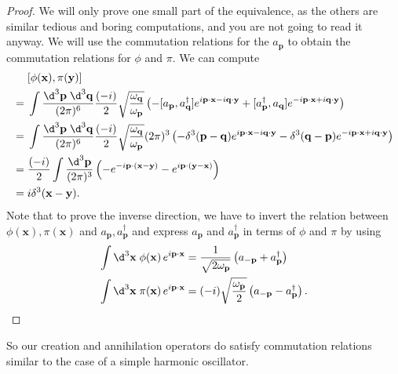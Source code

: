\documentclass[a4paper]{article}
\begin{document}
\begin{proof}
  We will only prove one small part of the equivalence, as the others are similar tedious and boring computations, and you are not going to read it anyway. We will use the commutation relations for the $a_\mathbf{p}$ to obtain the commutation relations for $\phi$ and $\pi$. We can compute
  \begin{align*}
    &[\phi(\mathbf{x}), \pi(\mathbf{y})]\\
    ={}& \int \frac{\d^3 \mathbf{p}\; \d^3 \mathbf{q}}{(2\pi)^6} \frac{(-i)}{2}\sqrt{\frac{\omega_\mathbf{q}}{\omega_\mathbf{p}}}\left(-[a_\mathbf{p}, a_\mathbf{q}^\dagger] e^{i\mathbf{p} \cdot \mathbf{x} - i \mathbf{q}\cdot \mathbf{y}} + [a_\mathbf{p}^\dagger, a_\mathbf{q}] e^{-i\mathbf{p}\cdot \mathbf{x} + i \mathbf{q}\cdot \mathbf{y}}\right)\\
    ={}& \int \frac{\d^3 \mathbf{p}\; \d^3 \mathbf{q}}{(2\pi)^6} \frac{(-i)}{2}\sqrt{\frac{\omega_\mathbf{q}}{\omega_\mathbf{p}}}(2\pi)^3\left(-\delta^3(\mathbf{p} - \mathbf{q}) e^{i\mathbf{p} \cdot \mathbf{x} - i \mathbf{q}\cdot \mathbf{y}} - \delta^3(\mathbf{q} - \mathbf{p}) e^{-i\mathbf{p}\cdot \mathbf{x} + i \mathbf{q}\cdot \mathbf{y}}\right)\\
    ={}& \frac{(-i)}{2} \int \frac{\d^3 \mathbf{p}}{(2\pi)^3} \left(-e^{-i\mathbf{p}\cdot (\mathbf{x} - \mathbf{y})} - e^{i\mathbf{p} \cdot(\mathbf{y} - \mathbf{x})}\right)\\
    ={}& i \delta^3(\mathbf{x} - \mathbf{y}).
  \end{align*}
  Note that to prove the inverse direction, we have to invert the relation between $\phi(\mathbf{x}), \pi(\mathbf{x})$ and $a_\mathbf{p}, a_\mathbf{p}^\dagger$ and express $a_\mathbf{p}$ and $a_\mathbf{p}^\dagger$ in terms of $\phi$ and $\pi$ by using
\begin{align*}
 \int \d^3 \mathbf{x} \; \phi(\mathbf{x}) \, e^{i \mathbf{p} \cdot \mathbf{x}} &= \frac{1}{\sqrt{2 \omega_\mathbf{p}}} \left(a_{-\mathbf{p}} + a_\mathbf{p}^\dagger \right)\\
 \int \d^3 \mathbf{x} \; \pi(\mathbf{x}) \, e^{i \mathbf{p} \cdot \mathbf{x}} &= (-i) \sqrt{\frac{\omega_\mathbf{p}}{2}}\left(a_{-\mathbf{p}} - a_\mathbf{p}^\dagger \right). \qedhere
\end{align*}
\end{proof}
So our creation and annihilation operators do satisfy commutation relations similar to the case of a simple harmonic oscillator.
\end{document}
